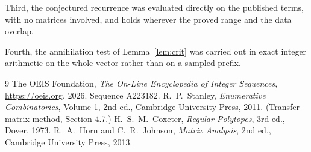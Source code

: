 \documentclass[11pt,a4paper]{article}
\theoremstyle{plain}
\theoremstyle{definition}
\begin{document}
Third, the conjectured recurrence was evaluated directly on the published terms, with no
matrices involved, and holds wherever the proved range and the data overlap.

Fourth, the annihilation test of Lemma~\ref{lem:crit} was carried out in exact integer
arithmetic on the whole vector rather than on a sampled prefix.

\begin{thebibliography}{9}
 The OEIS Foundation, \emph{The On-Line Encyclopedia of Integer
Sequences}, \url{https://oeis.org}, 2026. Sequence A223182.
 R.~P.~Stanley, \emph{Enumerative Combinatorics}, Volume 1, 2nd ed.,
Cambridge University Press, 2011. (Transfer-matrix method, Section 4.7.)
 H.~S.~M.~Coxeter, \emph{Regular Polytopes}, 3rd ed., Dover, 1973.
 R.~A.~Horn and C.~R.~Johnson, \emph{Matrix Analysis}, 2nd ed., Cambridge
University Press, 2013.
\end{thebibliography}
\end{document}
